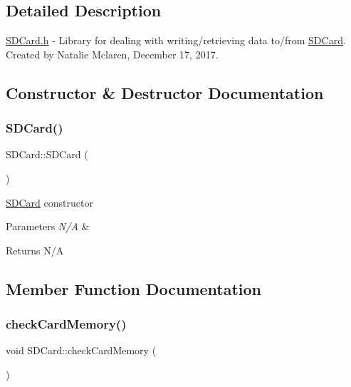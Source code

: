 \subsection{Detailed Description}
\mbox{\hyperlink{_s_d_card_8h}{S\+D\+Card.\+h}} -\/ Library for dealing with writing/retrieving data to/from \mbox{\hyperlink{class_s_d_card}{S\+D\+Card}}. Created by Natalie Mclaren, December 17, 2017. 

\subsection{Constructor \& Destructor Documentation}
\mbox{\label{class_s_d_card_aa57f64cf28817d210706222f60be9001}} 
\subsubsection{\texorpdfstring{S\+D\+Card()}{SDCard()}}
{\footnotesize\ttfamily S\+D\+Card\+::\+S\+D\+Card (\begin{DoxyParamCaption}{ }\end{DoxyParamCaption})}

\mbox{\hyperlink{class_s_d_card}{S\+D\+Card}} constructor 
\begin{DoxyParams}{Parameters}
{\em N/A} & \\
\hline
\end{DoxyParams}
\begin{DoxyReturn}{Returns}
N/A 
\end{DoxyReturn}


\subsection{Member Function Documentation}
\mbox{\label{class_s_d_card_a62c472309bd91560a29430d6946c05fb}} 
\subsubsection{\texorpdfstring{check\+Card\+Memory()}{checkCardMemory()}}
{\footnotesize\ttfamily void S\+D\+Card\+::check\+Card\+Memory (\begin{DoxyParamCaption}{ }\end{DoxyParamCaption})}

